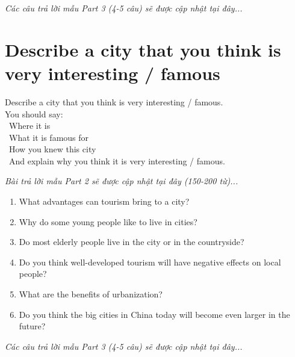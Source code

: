 \vspace{1em}
\textit{Các câu trả lời mẫu Part 3 (4-5 câu) sẽ được cập nhật tại đây...}
\vspace{2em}

\section{Describe a city that you think is very interesting / famous}
\begin{ieltsprompt}
Describe a city that you think is very interesting / famous. \\
You should say: \\
\textbullet\ Where it is \\
\textbullet\ What it is famous for \\
\textbullet\ How you knew this city \\
\textbullet\ And explain why you think it is very interesting / famous. \\
\end{ieltsprompt}

\vspace{1em}
\textit{Bài trả lời mẫu Part 2 sẽ được cập nhật tại đây (150-200 từ)...}
\vspace{2em}

\begin{ieltsprompt}
\begin{enumerate}[itemsep=4pt]
    \item What advantages can tourism bring to a city?
    \item Why do some young people like to live in cities?
    \item Do most elderly people live in the city or in the countryside?
    \item Do you think well-developed tourism will have negative effects on local people?
    \item What are the benefits of urbanization?
    \item Do you think the big cities in China today will become even larger in the future?
\end{enumerate}
\end{ieltsprompt}

\vspace{1em}
\textit{Các câu trả lời mẫu Part 3 (4-5 câu) sẽ được cập nhật tại đây...}
\vspace{2em}

